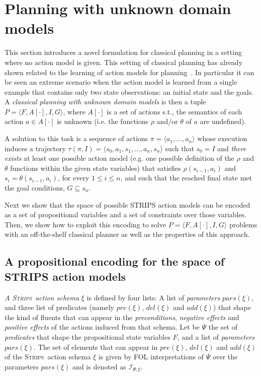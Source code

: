 \documentclass{article}
\newcommand{\tup}[1]{{\langle #1 \rangle}}
\newcommand{\strips}{\textsc{Strips}}
\begin{document}
\section{Planning with unknown domain models}
\label{sec:planning}
This section introduces a novel formulation for classical planning in a setting where no action model is given. This setting of classical planning has already shown related to the learning of action models for planning~\cite{SternJ17}. In particular it can be seen an extreme scenario when the action model is learned from a single example that contains only two state observations: an initial state and the goals. A {\em classical planning with unknown domain models} is then a tuple $P=\tup{F,A[\cdot],I,G}$, where $A[\cdot]$ is a set of actions s.t., the semantics of each action $a\in A[\cdot]$ is unknown (i.e. the functions $\rho$ and/or $\theta$ of $a$ are undefined). 

A solution to this task is a sequence of actions $\pi=\tup{a_1, \ldots, a_n}$ whose execution induces a trajectory $\tau(\pi,I)=\tup{s_0, a_1, s_1, \ldots, a_n, s_n}$ such that $s_0=I$ and {\em there exists} at least one possible action model (e.g. one possible definition of the $\rho$ and $\theta$ functions within the given state variables) that satisfies $\rho(s_{i-1},a_i)$ and $s_i=\theta(s_{i-1},a_i)$, for every {\small $1\leq i\leq n$}, and such that the reached final state met the goal conditions, $G \subseteq s_n$. 

Next we show that the space of possible STRIPS action models can be encoded as a set of propositional variables and a set of constraints over those variables. Then, we show how to exploit this encoding to solve $P=\tup{F,A[\cdot],I,G}$ problems with an off-the-shelf classical planner as well as the properties of this approach.


\subsection{A propositional encoding for the space of STRIPS action models}
{\em A \strips\ action schema} $\xi$ is defined by four lists: A list of {\em parameters} $pars(\xi)$, and three list of predicates (namely $pre(\xi)$, $del(\xi)$ and $add(\xi)$) that shape the kind of fluents that can appear in the {\em preconditions}, {\em negative effects} and {\em positive effects} of the actions induced from that schema. Let be $\Psi$ the set of {\em predicates} that shape the propositional state variables $F$, and a list of {\em parameters} $pars(\xi)$. The set of elements that can appear in $pre(\xi)$, $del(\xi)$ and $add(\xi)$ of the \strips\ action schema $\xi$ is given by FOL interpretations of $\Psi$ over the parameters $pars(\xi)$ and is denoted as ${\mathcal I}_{\Psi,\xi}$.
\end{document}
